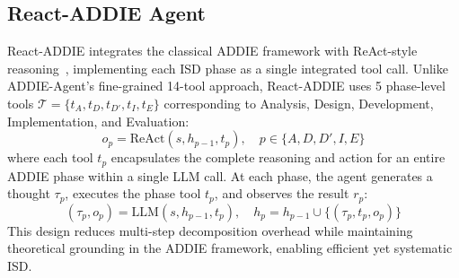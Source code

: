 \subsection{React-ADDIE Agent}
\label{subsec:react-addie}

React-ADDIE integrates the classical ADDIE framework with ReAct-style reasoning~\cite{yao2023react}, implementing each ISD phase as a single integrated tool call. Unlike ADDIE-Agent's fine-grained 14-tool approach, React-ADDIE uses 5 phase-level tools $\mathcal{T} = \{t_A, t_D, t_{D'}, t_I, t_E\}$ corresponding to Analysis, Design, Development, Implementation, and Evaluation:
\begin{equation}
o_p = \text{ReAct}(s, h_{p-1}, t_p), \quad p \in \{A, D, D', I, E\}
\end{equation}
where each tool $t_p$ encapsulates the complete reasoning and action for an entire ADDIE phase within a single LLM call. At each phase, the agent generates a thought $\tau_p$, executes the phase tool $t_p$, and observes the result $r_p$:
\begin{equation}
(\tau_p, o_p) = \text{LLM}(s, h_{p-1}, t_p), \quad h_p = h_{p-1} \cup \{(\tau_p, t_p, o_p)\}
\end{equation}
This design reduces multi-step decomposition overhead while maintaining theoretical grounding in the ADDIE framework, enabling efficient yet systematic ISD.

